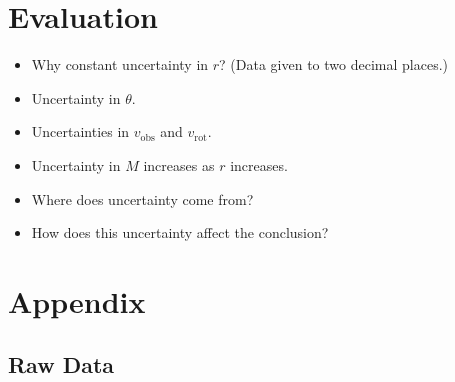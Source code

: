 \documentclass{article}
\newcommand\vrot{\ensuremath{v_{\textrm{rot}}}}
\newcommand\vobs{\ensuremath{v_{\textrm{obs}}}}
\begin{document}
\section{Evaluation}\label{sec:evaluation}

\begin{itemize}
    \item Why constant uncertainty in \(r\)? (Data given to two decimal places.)
    \item Uncertainty in \(\theta\).
    \item Uncertainties in \(\vobs\) and \(\vrot\).
    \item Uncertainty in \(M\) increases as \(r\) increases.
\end{itemize}

\begin{itemize}
    \item Where does uncertainty come from?
    \item How does this uncertainty affect the conclusion?
\end{itemize}

\appendix

\section{Appendix}

\subsection{Raw Data}\label{sec:raw-data}


\end{document}
